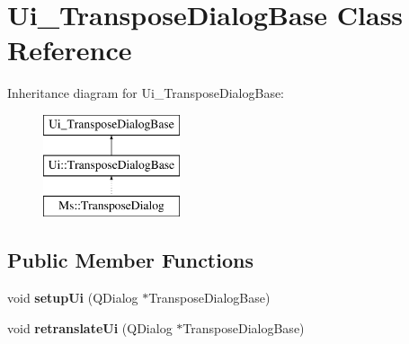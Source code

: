 \hypertarget{class_ui___transpose_dialog_base}{}\section{Ui\+\_\+\+Transpose\+Dialog\+Base Class Reference}
\label{class_ui___transpose_dialog_base}
Inheritance diagram for Ui\+\_\+\+Transpose\+Dialog\+Base\+:\begin{figure}[H]
\begin{center}
\leavevmode
\includegraphics[height=3.000000cm]{class_ui___transpose_dialog_base}
\end{center}
\end{figure}
\subsection*{Public Member Functions}
\begin{DoxyCompactItemize}
\item 
\mbox{\label{class_ui___transpose_dialog_base_ae0828ef50451999ed28857d044d7154c}} 
void {\bfseries setup\+Ui} (Q\+Dialog $\ast$Transpose\+Dialog\+Base)
\item 
\mbox{\label{class_ui___transpose_dialog_base_ab356c77dac1353ab34c6be2b24a8ef6e}} 
void {\bfseries retranslate\+Ui} (Q\+Dialog $\ast$Transpose\+Dialog\+Base)
\end{DoxyCompactItemize}
